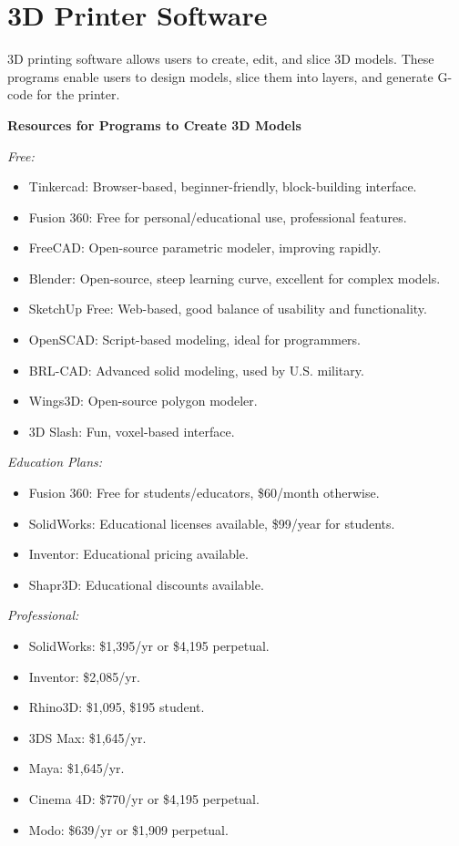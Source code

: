 \section{3D Printer Software}\label{d-printer-materials-program}
3D printing software allows users to create, edit, and slice 3D models. These programs enable users to design models, slice them into layers, and generate G-code for the printer.

\textbf{Resources for Programs to Create 3D Models}

\textit{Free:}
\begin{itemize}
    \item Tinkercad: Browser-based, beginner-friendly, block-building interface.
    \item Fusion 360: Free for personal/educational use, professional features.
    \item FreeCAD: Open-source parametric modeler, improving rapidly.
    \item Blender: Open-source, steep learning curve, excellent for complex models.
    \item SketchUp Free: Web-based, good balance of usability and functionality.
    \item OpenSCAD: Script-based modeling, ideal for programmers.
    \item BRL-CAD: Advanced solid modeling, used by U.S. military.
    \item Wings3D: Open-source polygon modeler.
    \item 3D Slash: Fun, voxel-based interface.
\end{itemize}

\textit{Education Plans:}
\begin{itemize}
    \item Fusion 360: Free for students/educators, \$60/month otherwise.
    \item SolidWorks: Educational licenses available, \$99/year for students.
    \item Inventor: Educational pricing available.
    \item Shapr3D: Educational discounts available.
\end{itemize}

\textit{Professional:}
\begin{itemize}
    \item SolidWorks: \$1,395/yr or \$4,195 perpetual.
    \item Inventor: \$2,085/yr.
    \item Rhino3D: \$1,095, \$195 student.
    \item 3DS Max: \$1,645/yr.
    \item Maya: \$1,645/yr.
    \item Cinema 4D: \$770/yr or \$4,195 perpetual.
    \item Modo: \$639/yr or \$1,909 perpetual.
\end{itemize}

